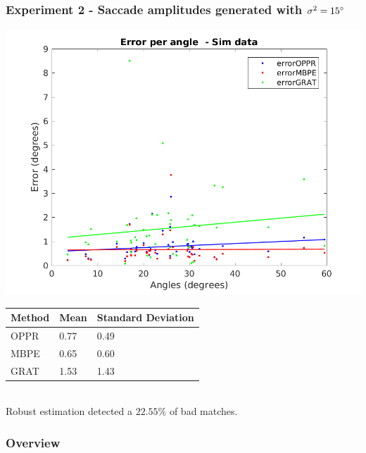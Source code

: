 \subsubsection{Experiment 2 - Saccade amplitudes generated with $\sigma^2 = 15 \degree $}
\begin{minipage}{0.5\textwidth}
	\centering
	\includegraphics[width=\textwidth]{images/sim/45angle.png}
	\label{cha5:sec1:45angle}
\end{minipage}
\begin{minipage}{0.5\textwidth}
	\centering
	\begin{tabular}{| l | l | l |}
		\hline
		Method & Mean & Standard Deviation \\
		\hline
		OPPR &  0.77 \degree & 0.49 \degree \\
		\hline
		MBPE &  0.65 \degree & 0.60 \degree \\
		\hline
		GRAT &  1.53 \degree & 1.43 \degree \\ 
		\hline
	\end{tabular}
	\label{cha5:sec1:45anglet}
\end{minipage}\\

Robust estimation detected a $ 22.55 \%$ of bad matches.

\subsubsection{Overview}



